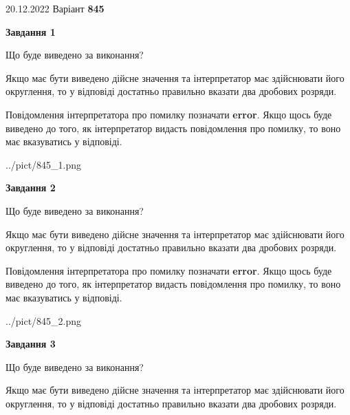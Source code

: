 \documentclass[12pt, ukrainian]{article}
\begin{document}
{20.12.2022 Варіант \No \textbf { 845 }\par}
{
\begin {Large}

{\begin {center}\textbf{Завдання 1}\end {center}}\par
Що буде виведено за виконання? \par

Якщо має бути виведено дійсне значення та інтерпретатор має здійснювати його округлення, 
то у відповіді достатньо правильно вказати два дробових розряди.

Повідомлення інтерпретатора про помилку позначати \textbf{error}.
Якщо щось буде виведено до того, як інтерпретатор видасть повідомлення про помилку, 
то воно має вказуватись у відповіді. \par

\begin{center}
	{../pict/845_1.png}
\end{center}
\newpage

{\begin {center}\textbf{Завдання 2}\end {center}}\par
Що буде виведено за виконання? \par

Якщо має бути виведено дійсне значення та інтерпретатор має здійснювати його округлення, 
то у відповіді достатньо правильно вказати два дробових розряди.

Повідомлення інтерпретатора про помилку позначати \textbf{error}.
Якщо щось буде виведено до того, як інтерпретатор видасть повідомлення про помилку, 
то воно має вказуватись у відповіді. \par

\begin{center}
	{../pict/845_2.png}
\end{center}
\newpage

{\begin {center}\textbf{Завдання 3}\end {center}}\par
Що буде виведено за виконання? \par

Якщо має бути виведено дійсне значення та інтерпретатор має здійснювати його округлення, 
то у відповіді достатньо правильно вказати два дробових розряди.


\end{Large}}
\end{document}
